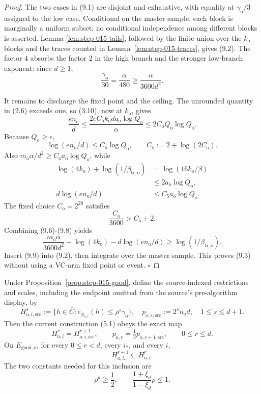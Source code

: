 \begin{proof}
The two cases in (9.1) are disjoint and exhaustive, with equality at
\(\gamma_{\mathrm o}/3\) assigned to the low case. Conditional on the
master sample, each block is marginally a uniform subset; no conditional
independence among different blocks is asserted. Lemma
\ref{lem:step-015-tails}, followed by the finite union over the
\(k_{\mathrm o}\) blocks and the traces counted in
Lemma~\ref{lem:step-015-traces}, gives (9.2). The factor \(4\) absorbs the
factor \(2\) in the high branch and the stronger low-branch exponent:
since \(d\ge1\),
\[
\frac{\gamma_{\mathrm o}}{30}
=\frac{\alpha}{480}
\ge\frac{\alpha}{3600d^2}.
\tag{9.4}
\]

It remains to discharge the fixed point and the ceiling. The unrounded
quantity in (2.6) exceeds one, so (3.10), now at \(k_{\mathrm o}\), gives
\[
\frac{en_{\mathrm o}}d
\le\frac{2eC_{\mathrm o}k_{\mathrm o}d
a_{\mathrm o}\log Q_{\mathrm o}}{\alpha}
\le2C_{\mathrm o}Q_{\mathrm o}\log Q_{\mathrm o}.
\tag{9.5}
\]
Because \(Q_{\mathrm o}\ge e\),
\[
\log(en_{\mathrm o}/d)
\le C_5\log Q_{\mathrm o},\qquad
C_5:=2+\log(2C_{\mathrm o}).
\tag{9.6}
\]
Also \(m_{\mathrm o}\alpha/d^2
\ge C_{\mathrm o}a_{\mathrm o}\log Q_{\mathrm o}\), while
\[
\begin{aligned}
\log(4k_{\mathrm o})+\log(1/\beta_{\mathrm{tr,o}})
&=\log(16k_{\mathrm o}/\beta)\\
&\le2a_{\mathrm o}\log Q_{\mathrm o},\\
d\log(en_{\mathrm o}/d)
&\le C_5a_{\mathrm o}\log Q_{\mathrm o}.
\end{aligned}
\tag{9.7}
\]
The fixed choice \(C_{\mathrm o}=2^{20}\) satisfies
\[
\frac{C_{\mathrm o}}{3600}>C_5+2.
\tag{9.8}
\]
Combining (9.6)-(9.8) yields
\[
\frac{m_{\mathrm o}\alpha}{3600d^2}
-\log(4k_{\mathrm o})-d\log(en_{\mathrm o}/d)
\ge\log(1/\beta_{\mathrm{tr,o}}).
\tag{9.9}
\]
Insert (9.9) into (9.2), then integrate over the master sample. This proves
(9.3) without using a VC-arm fixed point or event. \(\square\)


\end{proof}

\begin{lemma}\label{lem:step-015-source-map}
Under Proposition~\ref{prop:step-015-good}, define the source-indexed
restrictions and scales, including the endpoint omitted from the source's
pre-algorithm display, by
\[
H_{\mathrm o,i,\mathrm{src}}^s
:=\{h\in\bar C:
e_{\bar S_{\mathrm o,i}}(h)\le\rho^s\gamma_{\mathrm o}\},
\quad
p_{\mathrm o,s,\mathrm{src}}:=2^sn_{\mathrm o}d,
\quad 1\le s\le d+1.
\tag{10.1}
\]
Then the current construction (5.1) obeys the exact map
\[
H_{\mathrm o,i}^r=H_{\mathrm o,i,\mathrm{src}}^{r+1},
\qquad
p_{\mathrm o,r}=\tfrac12p_{\mathrm o,r+1,\mathrm{src}},
\qquad 0\le r\le d.
\tag{10.2}
\]
On \(E_{\mathrm{good,o}}\), for every \(0\le r<d\), every \(i_*\), and
every \(i\),
\[
H_{\mathrm o,i_*}^{r+1}\subseteq H_{\mathrm o,i}^r.
\tag{10.3}
\]
The two constants needed for this inclusion are
\[
\rho^d\ge\frac12,\qquad
\frac{1+\xi_d}{1-\xi_d}\rho\le1.
\tag{10.4}
\]


\end{lemma}


